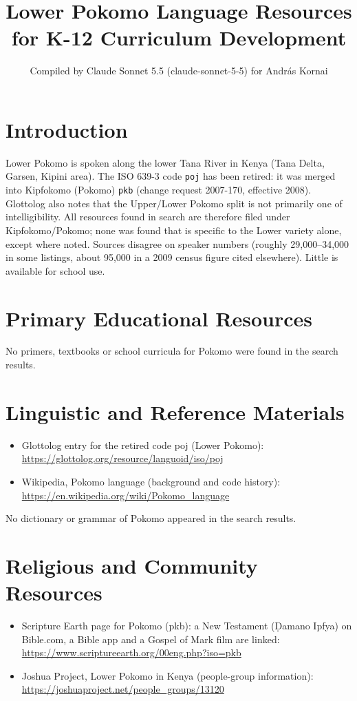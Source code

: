 \documentclass[12pt]{article}
\title{Lower Pokomo Language Resources for K-12 Curriculum Development}
\author{Compiled by Claude Sonnet 5.5 (claude-sonnet-5-5) for Andr\'as Kornai}
\date{}
\begin{document}
\maketitle

\section{Introduction}
Lower Pokomo is spoken along the lower Tana River in Kenya (Tana Delta, Garsen, Kipini area). The ISO 639-3 code \texttt{poj} has been retired: it was merged into Kipfokomo (Pokomo) \texttt{pkb} (change request 2007-170, effective 2008). Glottolog also notes that the Upper/Lower Pokomo split is not primarily one of intelligibility. All resources found in search are therefore filed under Kipfokomo/Pokomo; none was found that is specific to the Lower variety alone, except where noted. Sources disagree on speaker numbers (roughly 29,000--34,000 in some listings, about 95,000 in a 2009 census figure cited elsewhere). Little is available for school use.

\section{Primary Educational Resources}
No primers, textbooks or school curricula for Pokomo were found in the search results.

\section{Linguistic and Reference Materials}
\begin{itemize}
\item Glottolog entry for the retired code poj (Lower Pokomo): \url{https://glottolog.org/resource/languoid/iso/poj}
\item Wikipedia, Pokomo language (background and code history): \url{https://en.wikipedia.org/wiki/Pokomo_language}
\end{itemize}
No dictionary or grammar of Pokomo appeared in the search results.

\section{Religious and Community Resources}
\begin{itemize}
\item Scripture Earth page for Pokomo (pkb): a New Testament (Ḍamano Ipfya) on Bible.com, a Bible app and a Gospel of Mark film are linked: \url{https://www.scriptureearth.org/00eng.php?iso=pkb}
\item Joshua Project, Lower Pokomo in Kenya (people-group information): \url{https://joshuaproject.net/people_groups/13120}
\end{itemize}
\end{document}
